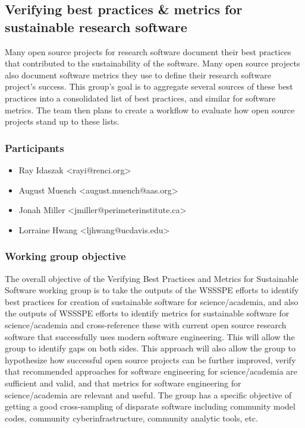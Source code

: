 \subsection{Verifying best practices \& metrics for sustainable research software}
\label{sec:best-practices-sustainable}


Many open source projects for research software document their best practices that contributed to the sustainability of the software.  Many open source projects also document software metrics they use to define their research software project's success.  This group's goal is to aggregate several sources of these best practices into a consolidated list of best practices, and similar for software metrics.  The team then plans to create a workflow to evaluate how open source projects stand up to these lists.

\subsubsection{Participants}

\begin{itemize}
\item Ray Idaszak <rayi@renci.org>
\item August Muench <august.muench@aas.org>
\item Jonah Miller <jmiller@perimeterinstitute.ca>
\item Lorraine Hwang <ljhwang@ucdavis.edu>
\end{itemize}

\subsubsection{Working group objective}

The overall objective of the Verifying Best Practices and Metrics for Sustainable Software working group is to take the outputs of the WSSSPE efforts to identify best practices for creation of sustainable software for science/academia, and also the outputs of WSSSPE efforts to identify metrics for sustainable software for science/academia and cross-reference these with current open source research software that successfully uses modern software engineering.  This will allow the group to identify gaps on both sides.  This approach will also allow the group to  hypothesize how successful open source projects can be further improved, verify that recommended approaches for software engineering for science/academia are sufficient and valid, and that metrics for software engineering for science/academia are relevant and useful.  The group has a specific objective of getting a good cross-sampling of disparate software including community model codes, community cyberinfrastructure, community analytic tools, etc.

